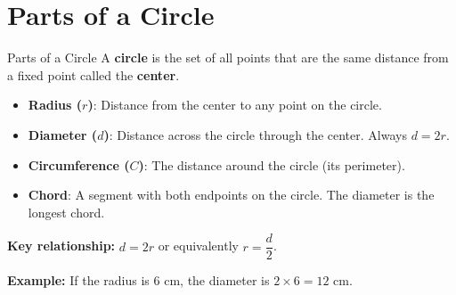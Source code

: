 \section{Parts of a Circle}

\begin{quickReview}{Parts of a Circle}
A \textbf{circle} is the set of all points that are the same distance from a fixed point called the \textbf{center}.

\begin{itemize}[leftmargin=*]
    \item \textbf{Radius ($r$)}: Distance from the center to any point on the circle.
    \item \textbf{Diameter ($d$)}: Distance across the circle through the center. Always $d = 2r$.
    \item \textbf{Circumference ($C$)}: The distance around the circle (its perimeter).
    \item \textbf{Chord}: A segment with both endpoints on the circle. The diameter is the longest chord.
\end{itemize}

\medskip
\textbf{Key relationship:} $d = 2r$ \quad or equivalently \quad $r = \dfrac{d}{2}$.

\smallskip
\textbf{Example:} If the radius is $6$ cm, the diameter is $2 \times 6 = 12$ cm.
\end{quickReview}

